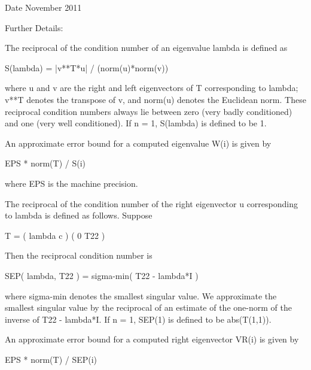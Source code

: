 \begin{DoxyDate}{Date}
November 2011 
\end{DoxyDate}
\begin{DoxyParagraph}{Further Details\+: }
\begin{DoxyVerb}  The reciprocal of the condition number of an eigenvalue lambda is
  defined as

          S(lambda) = |v**T*u| / (norm(u)*norm(v))

  where u and v are the right and left eigenvectors of T corresponding
  to lambda; v**T denotes the transpose of v, and norm(u)
  denotes the Euclidean norm. These reciprocal condition numbers always
  lie between zero (very badly conditioned) and one (very well
  conditioned). If n = 1, S(lambda) is defined to be 1.

  An approximate error bound for a computed eigenvalue W(i) is given by

                      EPS * norm(T) / S(i)

  where EPS is the machine precision.

  The reciprocal of the condition number of the right eigenvector u
  corresponding to lambda is defined as follows. Suppose

              T = ( lambda  c  )
                  (   0    T22 )

  Then the reciprocal condition number is

          SEP( lambda, T22 ) = sigma-min( T22 - lambda*I )

  where sigma-min denotes the smallest singular value. We approximate
  the smallest singular value by the reciprocal of an estimate of the
  one-norm of the inverse of T22 - lambda*I. If n = 1, SEP(1) is
  defined to be abs(T(1,1)).

  An approximate error bound for a computed right eigenvector VR(i)
  is given by

                      EPS * norm(T) / SEP(i)\end{DoxyVerb}
 
\end{DoxyParagraph}
